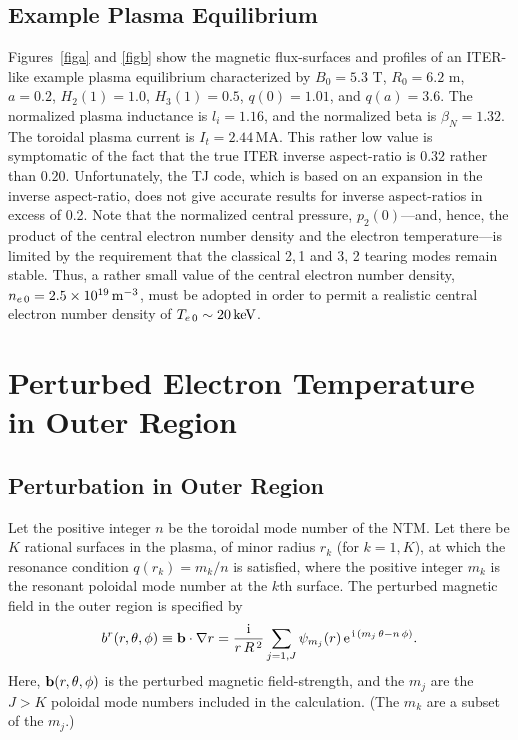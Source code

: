 \documentclass{iopjournal}
\begin{document}
\subsection{Example Plasma Equilibrium}
Figures~\ref{figa} and \ref{figb} show the magnetic flux-surfaces and profiles of an ITER-like  example plasma equilibrium characterized by 
$B_0=5.3$ T, $R_0=6.2$ m, $a=0.2$, $H_2(1)=1.0$,  $H_3(1)= 0.5$, $q(0)=1.01$, and  $q(a)=3.6$.  The normalized plasma inductance is
$l_i=1.16$, and the normalized beta is $\beta_N= 1.32$.
The toroidal plasma current is $I_t=2.44$\,MA. This rather low value
is symptomatic of the fact that the true ITER inverse aspect-ratio is  $0.32$ rather than $0.20$. Unfortunately, the TJ code, which is based on
an expansion in the inverse aspect-ratio,  does not give accurate results for inverse aspect-ratios
in excess of 0.2. 
Note that the normalized central pressure, $p_2(0)$---and, hence, the product of the central electron number density and the electron temperature---is  limited by the requirement that the classical
 2,\,1 and 3, 2 tearing modes remain stable. 
Thus,  a rather small value of the central electron number density, $n_{e\,0}=2.5\times 10^{19}\,{\rm m}^{-3}$, 
must be adopted  in order to permit a realistic central electron number density of $T_{e\,0}\sim 20\,{\rm keV}$. 

\section{Perturbed Electron Temperature  in Outer Region}\label{s3}
\subsection{Perturbation in Outer Region}
Let the positive integer $n$ be the toroidal mode number of the NTM. Let there be $K$ rational surfaces in the plasma, of minor radius $r_k$ (for $k=1,K$),  at which the resonance condition
$q(r_k) = m_k/n$ is satisfied, where the positive integer $m_k$ is the resonant poloidal mode number at the $k$th surface. The perturbed magnetic field in the outer region is specified 
by \cite{tear9,tear10}
\begin{equation}
b^r(r,\theta,\phi)\equiv {\bf b}\cdot\nabla r = \frac{{\rm i}}{r\,R^{\,2}}\sum_{j=1,J} \psi_{m_j}(r)\,{\rm e}^{\,{\rm i}\,(m_j\,\theta-n\,\phi)}.
\end{equation}
Here, ${\bf b}(r,\theta,\phi)$ is the perturbed magnetic field-strength, and the $m_j$ are the  $J>K$ poloidal mode numbers included in the calculation. (The $m_k$ are a subset of the $m_j$.) 
\end{document}
